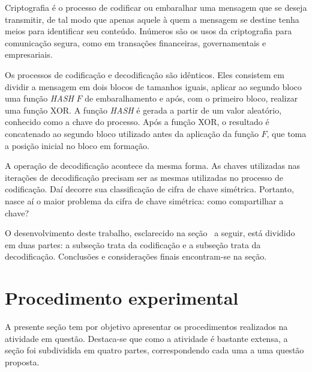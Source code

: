 \documentclass[a4paper,pra,aps,twocolumn,superscriptaddress,10pt,final]{revtex4-2}
\begin{document}
    Criptografia é o processo de codificar ou embaralhar uma mensagem que se deseja transmitir, de tal modo que apenas aquele à quem a mensagem se destine tenha meios para identificar seu conteúdo. Inúmeros são os usos da criptografia para comunicação segura, como em transações financeiras, governamentais e empresariais. 


    Os processos de codificação e decodificação são idênticos. Eles consistem em dividir a mensagem em dois blocos de tamanhos iguais, aplicar ao segundo bloco uma função \textit{HASH} $F$ de embaralhamento e após, com o primeiro bloco, realizar uma função XOR. A função \textit{HASH}  é gerada a partir de um valor aleatório, conhecido como a chave do processo. Após a função XOR, o resultado é concatenado ao segundo bloco utilizado antes da aplicação da função $F$, que toma a posição inicial no bloco em formação.

    A operação de decodificação acontece da mesma forma. As chaves utilizadas nas iterações de decodificação precisam ser as mesmas utilizadas no processo de codificação. Daí decorre sua classificação de cifra de chave simétrica. Portanto, nasce aí o maior problema da cifra de chave simétrica: como compartilhar a chave?
    
    O desenvolvimento deste trabalho, esclarecido na seção~ a seguir, está dividido em duas partes: a subseção trata da codificação e a subseção trata da decodificação. Conclusões e considerações finais encontram-se na seção.




\section{Procedimento experimental}
\label{sec:proced_exp}

    A presente seção tem por objetivo apresentar os procedimentos realizados na atividade em questão. Destaca-se que como a atividade é bastante extensa, a seção foi subdividida em quatro partes, correspondendo cada uma a uma questão proposta.
\end{document}

